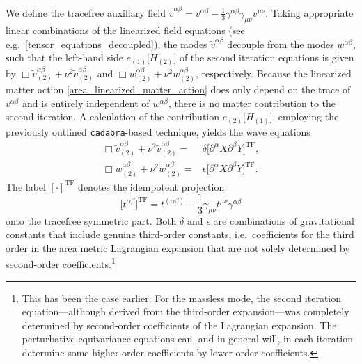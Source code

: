 We define the tracefree auxiliary field $\tilde v^{\alpha\beta} = v^{\alpha\beta} - \frac{1}{3}\gamma^{\alpha\beta}\gamma_{\mu\nu}v^{\mu\nu}$. Taking appropriate linear combinations of the linearized field equations (see e.g.~\eqref{tensor_equations_decoupled}), the modes $\tilde v^{\alpha\beta}$ decouple from the modes $w^{\alpha\beta}$, such that the left-hand side $e_{(1)}\lbrack H_{(2)}\rbrack$ of the second iteration equations is given by $\Box\tilde v^{\alpha\beta}_{(2)} + \nu^2\tilde v^{\alpha\beta}_{(2)}$ and $\Box w^{\alpha\beta}_{(2)} + \nu^2 w^{\alpha\beta}_{(2)}$, respectively. Because the linearized matter action \eqref{area_linearized_matter_action} does only depend on the trace of $v^{\alpha\beta}$ and is entirely independent of $w^{\alpha\beta}$, there is no matter contribution to the second iteration. A calculation of the contribution $e_{(2)}\lbrack H_{(1)}\rbrack$, employing the previously outlined \texttt{cadabra}-based technique, yields the wave equations
\begin{equation}\label{tracefree_second_order}
  \begin{aligned}
    \Box\tilde v^{\alpha\beta}_{(2)} + \nu^2\tilde v^{\alpha\beta}_{(2)} = {} & \delta \lbrack\partial^\alpha X\partial^\beta Y\rbrack^\text{TF}, \\
    \Box w^{\alpha\beta}_{(2)} + \nu^2w^{\alpha\beta}_{(2)} = {} & \epsilon \lbrack\partial^\alpha X\partial^\beta Y\rbrack^\text{TF}.
  \end{aligned}
\end{equation}
The label $[\cdot]^\text{TF}$ denotes the idempotent projection
\begin{equation}
  \lbrack t^{\alpha\beta}\rbrack^\text{TF} = t^{(\alpha\beta)} - \frac{1}{3}\gamma_{\mu\nu}t^{\mu\nu}\gamma^{\alpha\beta}
\end{equation}
onto the tracefree symmetric part. Both $\delta$ and $\epsilon$ are combinations of gravitational constants that include genuine third-order constants, i.e.~coefficients for the third order in the area metric Lagrangian expansion that are not solely determined by second-order coefficients.\footnote{This has been the case earlier: For the massless mode, the second iteration equation---although derived from the third-order expansion---was completely determined by second-order coefficients of the Lagrangian expansion. The perturbative equivariance equations can, and in general will, in each iteration determine some higher-order coefficients by lower-order coefficients.}

